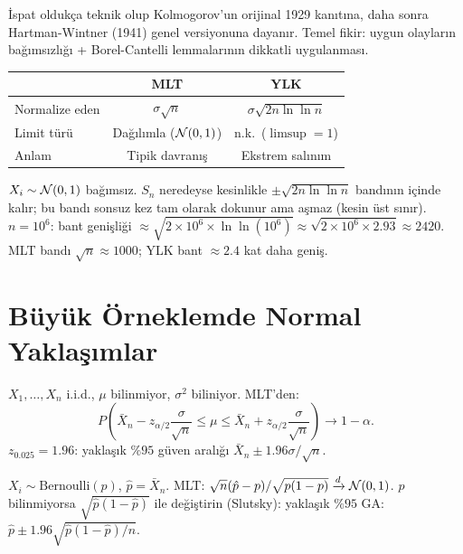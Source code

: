 İspat oldukça teknik olup Kolmogorov'un orijinal 1929 kanıtına, daha sonra
Hartman-Wintner (1941) genel versiyonuna dayanır.
Temel fikir: uygun olayların bağımsızlığı + Borel-Cantelli lemmalarının dikkatli uygulanması.

\begin{onerme}
\begin{center}
\begin{tabular}{lcc}
\toprule
 & MLT & YLK \\
\midrule
Normalize eden & $\sigma\sqrt{n}$ & $\sigma\sqrt{2n\ln\ln n}$ \\
Limit türü & Dağılımla ($\mathcal{N}(0,1)$) & n.k.\ ($\limsup = 1$) \\
Anlam & Tipik davranış & Ekstrem salınım \\
\bottomrule
\end{tabular}
\end{center}
\end{onerme}

\begin{ornek}
$X_i \sim \mathcal{N}(0,1)$ bağımsız. $S_n$ neredeyse kesinlikle
$\pm\sqrt{2n\ln\ln n}$ bandının içinde kalır; bu bandı sonsuz kez tam olarak dokunur
ama aşmaz (kesin üst sınır).
$n = 10^6$: bant genişliği $\approx \sqrt{2 \times 10^6 \times \ln\ln(10^6)} \approx \sqrt{2\times10^6\times2.93} \approx 2420$.
MLT bandı $\sqrt{n} \approx 1000$; YLK bant $\approx 2.4$ kat daha geniş.
\end{ornek}

\section{Büyük Örneklemde Normal Yaklaşımlar}
\label{sec:buyuk_orneklem}

\begin{onerme}
\label{prop:guven_araligi}
$X_1, \ldots, X_n$ i.i.d., $\mu$ bilinmiyor, $\sigma^2$ biliniyor. MLT'den:
\[
  P\!\left(\bar{X}_n - z_{\alpha/2}\frac{\sigma}{\sqrt{n}} \leq \mu \leq \bar{X}_n + z_{\alpha/2}\frac{\sigma}{\sqrt{n}}\right) \to 1-\alpha.
\]
$z_{0.025} = 1.96$: yaklaşık $\%95$ güven aralığı $\bar{X}_n \pm 1.96\sigma/\sqrt{n}$.
\end{onerme}

\begin{onerme}
\label{prop:oran_guven}
$X_i \sim \mathrm{Bernoulli}(p)$, $\hat{p} = \bar{X}_n$. MLT:
$\sqrt{n}(\hat{p}-p)/\sqrt{p(1-p)} \xrightarrow{d} \mathcal{N}(0,1)$.
$p$ bilinmiyorsa $\sqrt{\hat{p}(1-\hat{p})}$ ile değiştirin (Slutsky):
yaklaşık $\%95$ GA: $\hat{p} \pm 1.96\sqrt{\hat{p}(1-\hat{p})/n}$.
\end{onerme}

